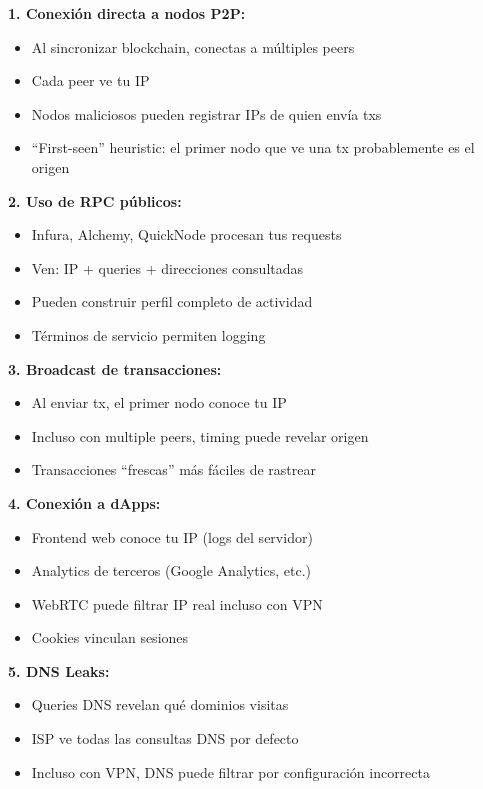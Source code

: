 \documentclass[11pt,a4paper,twoside]{book}
\theoremstyle{definition}
\theoremstyle{remark}
\begin{document}
\begin{mathnote}
\textbf{1. Conexión directa a nodos P2P:}
\begin{itemize}
    \item Al sincronizar blockchain, conectas a múltiples peers
    \item Cada peer ve tu IP
    \item Nodos maliciosos pueden registrar IPs de quien envía txs
    \item ``First-seen'' heuristic: el primer nodo que ve una tx probablemente es el origen
\end{itemize}

\textbf{2. Uso de RPC públicos:}
\begin{itemize}
    \item Infura, Alchemy, QuickNode procesan tus requests
    \item Ven: IP + queries + direcciones consultadas
    \item Pueden construir perfil completo de actividad
    \item Términos de servicio permiten logging
\end{itemize}

\textbf{3. Broadcast de transacciones:}
\begin{itemize}
    \item Al enviar tx, el primer nodo conoce tu IP
    \item Incluso con multiple peers, timing puede revelar origen
    \item Transacciones ``frescas'' más fáciles de rastrear
\end{itemize}

\textbf{4. Conexión a dApps:}
\begin{itemize}
    \item Frontend web conoce tu IP (logs del servidor)
    \item Analytics de terceros (Google Analytics, etc.)
    \item WebRTC puede filtrar IP real incluso con VPN
    \item Cookies vinculan sesiones
\end{itemize}

\textbf{5. DNS Leaks:}
\begin{itemize}
    \item Queries DNS revelan qué dominios visitas
    \item ISP ve todas las consultas DNS por defecto
    \item Incluso con VPN, DNS puede filtrar por configuración incorrecta
\end{itemize}
\end{mathnote}
\end{document}

